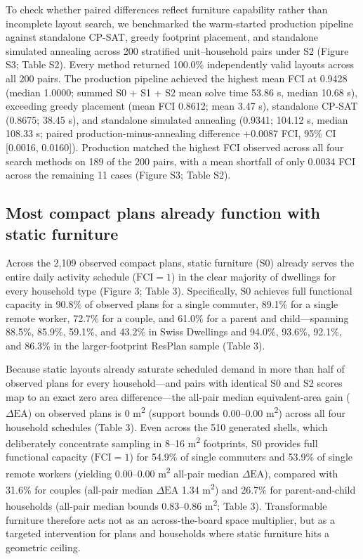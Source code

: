 \documentclass[12pt,letterpaper]{article}
\begin{document}
To check whether paired differences reflect furniture capability rather than incomplete layout search, we benchmarked the warm-started production pipeline against standalone CP-SAT, greedy footprint placement, and standalone simulated annealing across 200 stratified unit--household pairs under S2 (Figure S3; Table S2). Every method returned 100.0\% independently valid layouts across all 200 pairs. The production pipeline achieved the highest mean FCI at 0.9428 (median 1.0000; summed S0 + S1 + S2 mean solve time 53.86 s, median 10.68 s), exceeding greedy placement (mean FCI 0.8612; mean 3.47 s), standalone CP-SAT (0.8675; 38.45 s), and standalone simulated annealing (0.9341; 104.12 s, median 108.33 s; paired production-minus-annealing difference +0.0087 FCI, 95\% CI {[}0.0016, 0.0160{]}). Production matched the highest FCI observed across all four search methods on 189 of the 200 pairs, with a mean shortfall of only 0.0034 FCI across the remaining 11 cases (Figure S3; Table S2).

\subsection{Most compact plans already function with static furniture}\label{most-compact-plans-already-function-with-static-furniture}

Across the 2,109 observed compact plans, static furniture (S0) already serves the entire daily activity schedule (\(\text{FCI} = 1\)) in the clear majority of dwellings for every household type (Figure 3; Table 3). Specifically, S0 achieves full functional capacity in 90.8\% of observed plans for a single commuter, 89.1\% for a single remote worker, 72.7\% for a couple, and 61.0\% for a parent and child---spanning 88.5\%, 85.9\%, 59.1\%, and 43.2\% in Swiss Dwellings and 94.0\%, 93.6\%, 92.1\%, and 86.3\% in the larger-footprint ResPlan sample (Table 3).

Because static layouts already saturate scheduled demand in more than half of observed plans for every household---and pairs with identical S0 and S2 scores map to an exact zero area difference---the all-pair median equivalent-area gain (\(\Delta\text{EA}\)) on observed plans is 0 m\textsuperscript{2} (support bounds 0.00--0.00 m\textsuperscript{2}) across all four household schedules (Table 3). Even across the 510 generated shells, which deliberately concentrate sampling in 8--16 m\textsuperscript{2} footprints, S0 provides full functional capacity (\(\text{FCI} = 1\)) for 54.9\% of single commuters and 53.9\% of single remote workers (yielding 0.00--0.00 m\textsuperscript{2} all-pair median \(\Delta\text{EA}\)), compared with 31.6\% for couples (all-pair median \(\Delta\text{EA}\) 1.34 m\textsuperscript{2}) and 26.7\% for parent-and-child households (all-pair median bounds 0.83--0.86 m\textsuperscript{2}; Table 3). Transformable furniture therefore acts not as an across-the-board space multiplier, but as a targeted intervention for plans and households where static furniture hits a geometric ceiling.
\end{document}
